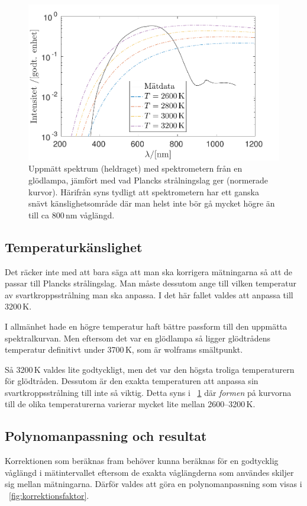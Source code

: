 \documentclass[11pt,a4paper]{article}
\newcommand{\figref}{\figurename~\ref}
\begin{document}
\begin{figure}\centering
\centerline{ %
\includegraphics[width=.9\textwidth]{svartkropp.pdf}
}
\caption{Uppmätt spektrum (heldraget) med spektrometern från en
  glödlampa, jämfört med vad Plancks strålningslag ger (normerade
  kurvor). Härifrån syns tydligt att spektrometern har ett ganska
  snävt känslighetsområde där man helst inte bör gå mycket högre än
  till ca 800\,nm våglängd.}
\label{fig:svartkropp}
\end{figure}


\subsection{Temperaturkänslighet}
Det räcker inte med att bara säga att man ska korrigera mätningarna
så att de passar till Plancks strålingslag. Man måste dessutom ange
till vilken temperatur av svartkroppsstrålning man ska anpassa. I det
här fallet valdes att anpassa till 3200\,K. 

I allmänhet hade en högre temperatur haft bättre passform till den
uppmätta spektralkurvan. Men eftersom det var en glödlampa så ligger
glödtrådens temperatur definitivt under 3700\,K, som är wolframs
smältpunkt. 

Så 3200\,K valdes lite godtyckligt, men det var den högsta troliga
temperaturern för glödtråden. Dessutom är den exakta temperaturen att
anpassa sin svartkroppsstrålning till inte så viktig. Detta syns i
\figref{fig:svartkropp} där \emph{formen} på kurvorna till de olika
temperaturerna varierar mycket lite mellan 2600--3200\,K. 


\subsection{Polynomanpassning och resultat}
Korrektionen som beräknas fram behöver kunna beräknas för en
godtycklig våglängd i mätintervallet eftersom de exakta våglängderna
som användes skiljer sig mellan mätningarna. Därför valdes att göra en
polynomanpassning som visas i \figref{fig:korrektionsfaktor}. 
\end{document}
